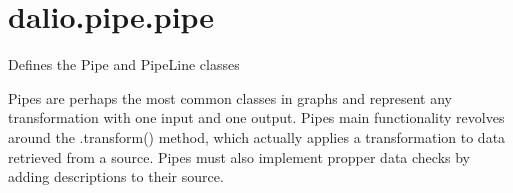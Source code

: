 \documentclass[letterpaper,10pt,english]{sphinxmanual}
\begin{document}
\section{dalio.pipe.pipe}
\label{\detokenize{dalio.pipe:module-dalio.pipe.pipe}}\label{\detokenize{dalio.pipe:dalio-pipe-pipe}}
Defines the Pipe and PipeLine classes

Pipes are perhaps the most common classes in graphs and represent any
transformation with one input and one output. Pipes\textasciigrave{} main functionality
revolves around the .transform() method, which actually applies a
transformation to data retrieved from a source. Pipes must also implement
propper data checks by adding descriptions to their source.
\end{document}
